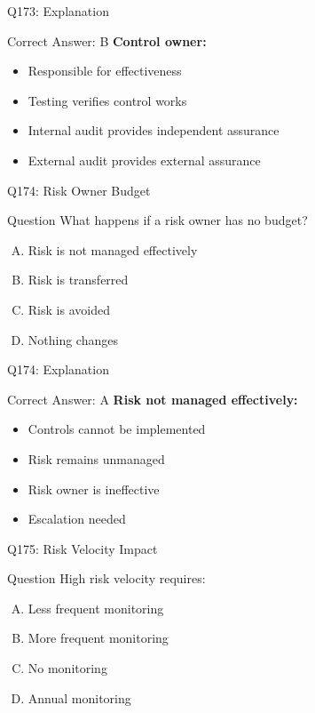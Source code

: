\documentclass{beamer}
\begin{document}
	\begin{frame}{Q173: Explanation}
		\begin{block}{Correct Answer: B}
			\textbf{Control owner:}
			\begin{itemize}
				\item Responsible for effectiveness
				\item Testing verifies control works
				\item Internal audit provides independent assurance
				\item External audit provides external assurance
			\end{itemize}
		\end{block}
	\end{frame}
	
	\begin{frame}{Q174: Risk Owner Budget}
		\begin{block}{Question}
			What happens if a risk owner has no budget?
		\end{block}
		\begin{enumerate}[(A)]
			\item Risk is not managed effectively
			\item Risk is transferred
			\item Risk is avoided
			\item Nothing changes
		\end{enumerate}
	\end{frame}
	
	\begin{frame}{Q174: Explanation}
		\begin{block}{Correct Answer: A}
			\textbf{Risk not managed effectively:}
			\begin{itemize}
				\item Controls cannot be implemented
				\item Risk remains unmanaged
				\item Risk owner is ineffective
				\item Escalation needed
			\end{itemize}
		\end{block}
	\end{frame}
	
	\begin{frame}{Q175: Risk Velocity Impact}
		\begin{block}{Question}
			High risk velocity requires:
		\end{block}
		\begin{enumerate}[(A)]
			\item Less frequent monitoring
			\item More frequent monitoring
			\item No monitoring
			\item Annual monitoring
		\end{enumerate}
	\end{frame}
	
\end{document}
